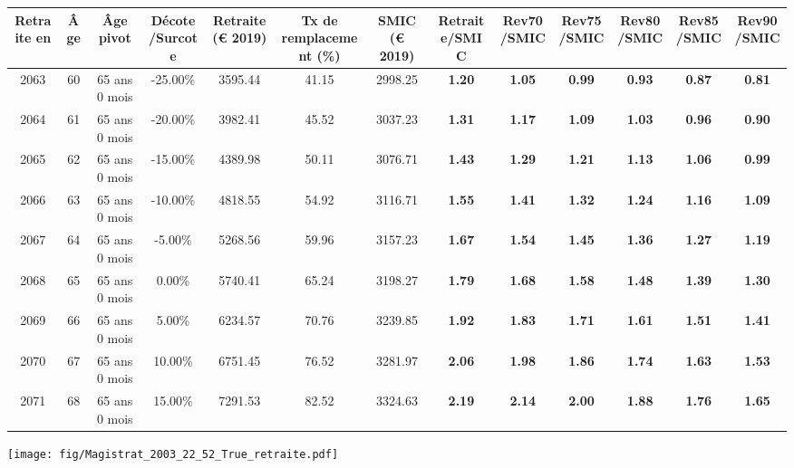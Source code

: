 { \scriptsize \begin{center} 
\begin{tabular}[htb]{|c|c||c|c||c|c||c||c|c|c|c|c|c|} 
\hline 
 Retraite en &  Âge &  Âge pivot &  Décote/Surcote &  Retraite (\euro{} 2019) &  Tx de remplacement (\%) &  SMIC (\euro{} 2019) &  Retraite/SMIC &  Rev70/SMIC &  Rev75/SMIC &  Rev80/SMIC &  Rev85/SMIC &  Rev90/SMIC \\ 
\hline \hline 
 2063 &  60 &  65 ans 0 mois &  -25.00\% &  3595.44 &  41.15 &  2998.25 &  {\bf 1.20} &  {\bf 1.05} &  {\bf {\color{red} 0.99}} &  {\bf {\color{red} 0.93}} &  {\bf {\color{red} 0.87}} &  {\bf {\color{red} 0.81}} \\ 
\hline 
 2064 &  61 &  65 ans 0 mois &  -20.00\% &  3982.41 &  45.52 &  3037.23 &  {\bf 1.31} &  {\bf 1.17} &  {\bf 1.09} &  {\bf 1.03} &  {\bf {\color{red} 0.96}} &  {\bf {\color{red} 0.90}} \\ 
\hline 
 2065 &  62 &  65 ans 0 mois &  -15.00\% &  4389.98 &  50.11 &  3076.71 &  {\bf 1.43} &  {\bf 1.29} &  {\bf 1.21} &  {\bf 1.13} &  {\bf 1.06} &  {\bf {\color{red} 0.99}} \\ 
\hline 
 2066 &  63 &  65 ans 0 mois &  -10.00\% &  4818.55 &  54.92 &  3116.71 &  {\bf 1.55} &  {\bf 1.41} &  {\bf 1.32} &  {\bf 1.24} &  {\bf 1.16} &  {\bf 1.09} \\ 
\hline 
 2067 &  64 &  65 ans 0 mois &  -5.00\% &  5268.56 &  59.96 &  3157.23 &  {\bf 1.67} &  {\bf 1.54} &  {\bf 1.45} &  {\bf 1.36} &  {\bf 1.27} &  {\bf 1.19} \\ 
\hline 
 2068 &  65 &  65 ans 0 mois &  0.00\% &  5740.41 &  65.24 &  3198.27 &  {\bf 1.79} &  {\bf 1.68} &  {\bf 1.58} &  {\bf 1.48} &  {\bf 1.39} &  {\bf 1.30} \\ 
\hline 
 2069 &  66 &  65 ans 0 mois &  5.00\% &  6234.57 &  70.76 &  3239.85 &  {\bf 1.92} &  {\bf 1.83} &  {\bf 1.71} &  {\bf 1.61} &  {\bf 1.51} &  {\bf 1.41} \\ 
\hline 
 2070 &  67 &  65 ans 0 mois &  10.00\% &  6751.45 &  76.52 &  3281.97 &  {\bf 2.06} &  {\bf 1.98} &  {\bf 1.86} &  {\bf 1.74} &  {\bf 1.63} &  {\bf 1.53} \\ 
\hline 
 2071 &  68 &  65 ans 0 mois &  15.00\% &  7291.53 &  82.52 &  3324.63 &  {\bf 2.19} &  {\bf 2.14} &  {\bf 2.00} &  {\bf 1.88} &  {\bf 1.76} &  {\bf 1.65} \\ 
\hline 
\hline 
\end{tabular} 
\end{center} } 

 \begin{center}\texttt{[image: fig/Magistrat\_2003\_22\_52\_True\_retraite.pdf]}\end{center} 

